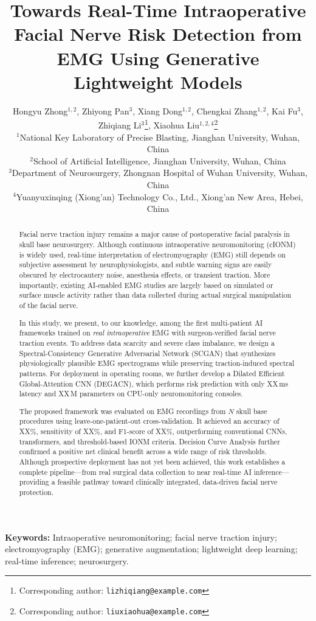 \documentclass[10pt]{article}
\title{\textbf{Towards Real-Time Intraoperative Facial Nerve Risk Detection from EMG Using Generative Lightweight Models}}
\author{
    Hongyu Zhong$^{1,2}$,
    Zhiyong Pan$^{3}$,
    Xiang Dong$^{1,2}$,
     Chengkai Zhang$^{1,2}$,
    Kai Fu$^{3}$,\\
    Zhiqiang Li$^{3}$\thanks{Corresponding author: \texttt{lizhiqiang@example.com}},
    Xiaohua Liu$^{1,2,4}$\thanks{Corresponding author: \texttt{liuxiaohua@example.com}}\\[6pt]
    $^{1}$National Key Laboratory of Precise Blasting, Jianghan University, Wuhan, China\\
    $^{2}$School of Artificial Intelligence, Jianghan University, Wuhan, China\\
    $^{3}$Department of Neurosurgery, Zhongnan Hospital of Wuhan University, Wuhan, China\\
    $^{4}$Yuanyuxinqing (Xiong'an) Technology Co., Ltd., Xiong'an New Area, Hebei, China
}
\date{} %
\begin{document}
\maketitle

\begin{abstract}
Facial nerve traction injury remains a major cause of postoperative facial paralysis in skull base neurosurgery. Although continuous intraoperative neuromonitoring (cIONM) is widely used, real-time interpretation of electromyography (EMG) still depends on subjective assessment by neurophysiologists, and subtle warning signs are easily obscured by electrocautery noise, anesthesia effects, or transient traction. More importantly, existing AI-enabled EMG studies are largely based on simulated or surface muscle activity rather than data collected during actual surgical manipulation of the facial nerve.

In this study, we present, to our knowledge, among the first multi-patient AI frameworks trained on \emph{real intraoperative} EMG with surgeon-verified facial nerve traction events. To address data scarcity and severe class imbalance, we design a Spectral-Consistency Generative Adversarial Network (SCGAN) that synthesizes physiologically plausible EMG spectrograms while preserving traction-induced spectral patterns. For deployment in operating rooms, we further develop a Dilated Efficient Global-Attention CNN (DEGACN), which performs risk prediction with only XX\,ms latency and XX\,M parameters on CPU-only neuromonitoring consoles.

The proposed framework was evaluated on EMG recordings from $N$ skull base procedures using leave-one-patient-out cross-validation. It achieved an accuracy of XX\%, sensitivity of XX\%, and F1-score of XX\%, outperforming conventional CNNs, transformers, and threshold-based IONM criteria. Decision Curve Analysis further confirmed a positive net clinical benefit across a wide range of risk thresholds. Although prospective deployment has not yet been achieved, this work establishes a complete pipeline—from real surgical data collection to near real-time AI inference—providing a feasible pathway toward clinically integrated, data-driven facial nerve protection.
\end{abstract}

\noindent\textbf{Keywords:}
Intraoperative neuromonitoring; facial nerve traction injury; electromyography (EMG); generative augmentation; lightweight deep learning; real-time inference; neurosurgery.
\end{document}
